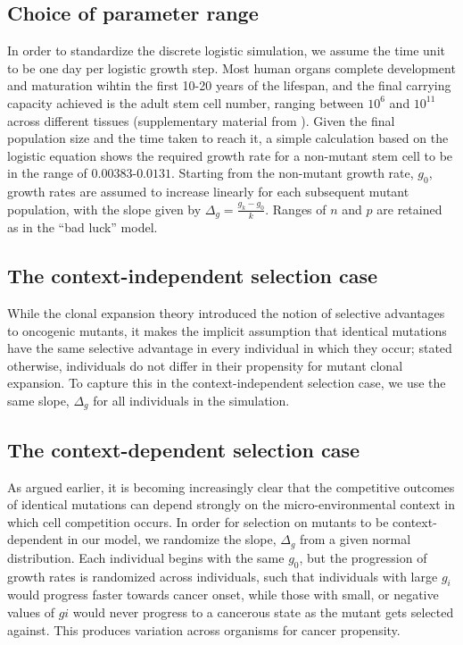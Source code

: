 \documentclass[9pt,twocolumn,twoside]{pnas-new}
\begin{document}
	\subsection{Choice of parameter range}
	In order to standardize the discrete logistic simulation, we assume the time unit to be one day per logistic growth step. Most human organs complete development and maturation wihtin the first 10-20 years of the lifespan, and the final carrying capacity achieved is the adult stem cell number, ranging between $10^{6}$ and $10^{11}$ across different tissues (supplementary material from \cite{Tomasetti78}). Given the final population size and the time taken to reach it, a simple calculation based on the logistic equation shows the required growth rate for a non-mutant stem cell to be in the range of $0.00383$-$0.0131$. Starting from the non-mutant growth rate, $g_{0}$, growth rates are assumed to increase linearly for each subsequent mutant population, with the slope given by $\Delta_{g}=\frac{g_{k}-g_{0}}{k}$. Ranges of $n$ and $p$ are retained as in the ``bad luck'' model.

	\subsection{The context-independent selection case}
	While the clonal expansion theory introduced the notion of selective advantages to oncogenic mutants, it makes the implicit assumption that identical mutations have the same selective advantage in every individual in which they occur; stated otherwise, individuals do not differ in their propensity for mutant clonal expansion. To capture this in the context-independent selection case, we use the same slope, $\Delta_{g}$ for all individuals in the simulation.

	\subsection{The context-dependent selection case}
	As argued earlier, it is becoming increasingly clear that the competitive outcomes of identical mutations can depend strongly on the micro-environmental context in which cell competition occurs. In order for selection on mutants to be context-dependent in our model, we randomize the slope, $\Delta_{g}$ from a given normal distribution. Each individual begins with the same $g_{0}$, but the progression of growth rates is randomized across individuals, such that individuals with large $g_{i}$ would progress faster towards cancer onset, while those with small, or negative values of $g{i}$ would never progress to a cancerous state as the mutant gets selected against. This produces variation across organisms for cancer propensity.
\end{document}
